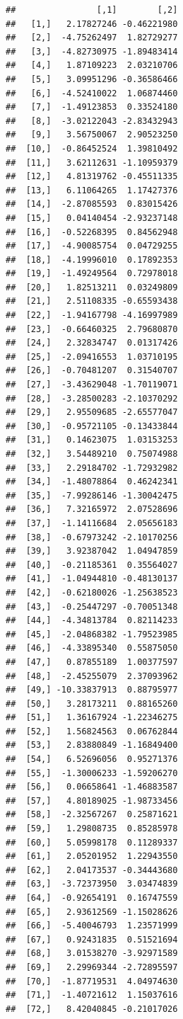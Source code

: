 \documentclass[
]{article}
\begin{document}
\begin{verbatim}
##                [,1]        [,2]
##   [1,]   2.17827246 -0.46221980
##   [2,]  -4.75262497  1.82729277
##   [3,]  -4.82730975 -1.89483414
##   [4,]   1.87109223  2.03210706
##   [5,]   3.09951296 -0.36586466
##   [6,]  -4.52410022  1.06874460
##   [7,]  -1.49123853  0.33524180
##   [8,]  -3.02122043 -2.83432943
##   [9,]   3.56750067  2.90523250
##  [10,]  -0.86452524  1.39810492
##  [11,]   3.62112631 -1.10959379
##  [12,]   4.81319762 -0.45511335
##  [13,]   6.11064265  1.17427376
##  [14,]  -2.87085593  0.83015426
##  [15,]   0.04140454 -2.93237148
##  [16,]  -0.52268395  0.84562948
##  [17,]  -4.90085754  0.04729255
##  [18,]  -4.19996010  0.17892353
##  [19,]  -1.49249564  0.72978018
##  [20,]   1.82513211  0.03249809
##  [21,]   2.51108335 -0.65593438
##  [22,]  -1.94167798 -4.16997989
##  [23,]  -0.66460325  2.79680870
##  [24,]   2.32834747  0.01317426
##  [25,]  -2.09416553  1.03710195
##  [26,]  -0.70481207  0.31540707
##  [27,]  -3.43629048 -1.70119071
##  [28,]  -3.28500283 -2.10370292
##  [29,]   2.95509685 -2.65577047
##  [30,]  -0.95721105 -0.13433844
##  [31,]   0.14623075  1.03153253
##  [32,]   3.54489210  0.75074988
##  [33,]   2.29184702 -1.72932982
##  [34,]  -1.48078864  0.46242341
##  [35,]  -7.99286146 -1.30042475
##  [36,]   7.32165972  2.07528696
##  [37,]  -1.14116684  2.05656183
##  [38,]  -0.67973242 -2.10170256
##  [39,]   3.92387042  1.04947859
##  [40,]  -0.21185361  0.35564027
##  [41,]  -1.04944810 -0.48130137
##  [42,]  -0.62180026 -1.25638523
##  [43,]  -0.25447297 -0.70051348
##  [44,]  -4.34813784  0.82114233
##  [45,]  -2.04868382 -1.79523985
##  [46,]  -4.33895340  0.55875050
##  [47,]   0.87855189  1.00377597
##  [48,]  -2.45255079  2.37093962
##  [49,] -10.33837913  0.88795977
##  [50,]   3.28173211  0.88165260
##  [51,]   1.36167924 -1.22346275
##  [52,]   1.56824563  0.06762844
##  [53,]   2.83880849 -1.16849400
##  [54,]   6.52696056  0.95271376
##  [55,]  -1.30006233 -1.59206270
##  [56,]   0.06658641 -1.46883587
##  [57,]   4.80189025 -1.98733456
##  [58,]  -2.32567267  0.25871621
##  [59,]   1.29808735  0.85285978
##  [60,]   5.05998178  0.11289337
##  [61,]   2.05201952  1.22943550
##  [62,]   2.04173537 -0.34443680
##  [63,]  -3.72373950  3.03474839
##  [64,]  -0.92654191  0.16747559
##  [65,]   2.93612569 -1.15028626
##  [66,]  -5.40046793  1.23571999
##  [67,]   0.92431835  0.51521694
##  [68,]   3.01538270 -3.92971589
##  [69,]   2.29969344 -2.72895597
##  [70,]  -1.87719531  4.04974630
##  [71,]  -1.40721612  1.15037616
##  [72,]   8.42040845 -0.21017026

\end{verbatim}
\end{document}
